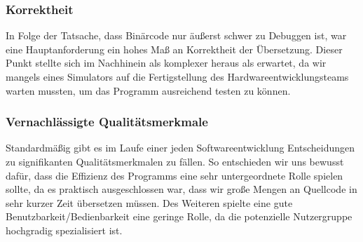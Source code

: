 \documentclass[paper=a4,fontsize=12pt,twocolumn]{scrreprt}
\begin{document}
\subsubsection{Korrektheit}
In Folge der Tatsache, dass Binärcode nur äußerst schwer zu Debuggen ist, war eine Hauptanforderung ein hohes Maß an Korrektheit der Übersetzung.
Dieser Punkt stellte sich im Nachhinein als komplexer heraus als erwartet, da wir mangels eines Simulators auf die Fertigstellung des Hardwareentwicklungsteams warten mussten, um das Programm ausreichend testen zu können.

\subsubsection{Vernachlässigte Qualitätsmerkmale}
Standardmäßig gibt es im Laufe einer jeden Softwareentwicklung Entscheidungen zu signifikanten Qualitätsmerkmalen zu fällen.
So entschieden wir uns bewusst dafür, dass die Effizienz des Programms eine sehr untergeordnete Rolle spielen sollte, da es praktisch ausgeschlossen war, dass wir große Mengen an Quellcode in sehr kurzer Zeit übersetzen müssen. 
Des Weiteren spielte eine gute Benutzbarkeit/Bedienbarkeit eine geringe Rolle, da die potenzielle Nutzergruppe hochgradig spezialisiert ist. 
\end{document}
